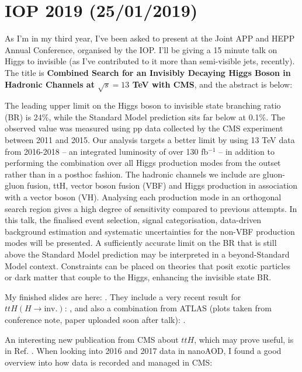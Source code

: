 \section{IOP 2019 (25/01/2019)}

As I'm in my third year, I've been asked to present at the Joint APP and HEPP Annual Conference, organised by the IOP. I'll be giving a 15 minute talk on Higgs to invisible (as I've contributed to it more than semi-visible jets, recently). The title is \textbf{Combined Search for an Invisibly Decaying Higgs Boson in Hadronic Channels at $\sqrt{s} = 13$ TeV with CMS}, and the abstract is below:

The leading upper limit on the Higgs boson to invisible state branching ratio (BR) is 24\%, while the Standard Model prediction sits far below at 0.1\%. The observed value was measured using pp data collected by the CMS experiment between 2011 and 2015. Our analysis targets a better limit by using 13 TeV data from 2016-2018 -- an integrated luminosity of over 130 fb$^{-1}$ -- in addition to performing the combination over all Higgs production modes from the outset rather than in a posthoc fashion. The hadronic channels we include are gluon-gluon fusion, ttH, vector boson fusion (VBF) and Higgs production in association with a vector boson (VH). Analysing each production mode in an orthogonal search region gives a high degree of sensitivity compared to previous attempts. In this talk, the finalised event selection, signal categorisation, data-driven background estimation and systematic uncertainties for the non-VBF production modes will be presented. A sufficiently accurate limit on the BR that is still above the Standard Model prediction may be interpreted in a beyond-Standard Model context. Constraints can be placed on theories that posit exotic particles or dark matter that couple to the Higgs, enhancing the invisible state BR.

My finished slides are here: %
. They include a very recent result for $ttH (H \rightarrow \mathrm{inv.})$: \cite{CMS-PAS-HIG-18-008}, and also a combination from ATLAS (plots taken from conference note, paper uploaded soon after talk): \cite{Aaboud:2019rtt}.


An interesting new publication from CMS about $ttH$, which may prove useful, is in Ref. \cite{PhysRevLett.120.231801}.
When looking into 2016 and 2017 data in nanoAOD, I found a good overview into how data is recorded and managed in CMS: %
